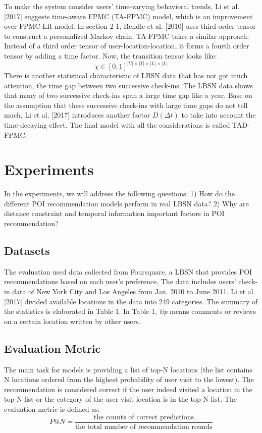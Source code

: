 \documentclass{sig-alternate}
\begin{document}
To make the system consider users' time-varying behavioral trends, Li et al. [2017] suggests time-aware FPMC (TA-FPMC) 
model, which is an improvement over FPMC-LR model. In section 2-1, Rendle et al. [2010] uses third order tensor to 
construct a personalized Markov chain. TA-FPMC takes a similar approach. Instead of a third order tensor of 
user-location-location, it forms a fourth order tensor by adding a time factor. Now, the transition tensor looks like: 
\begin{equation}
	\chi \in [0, 1]^{|U| \times |T| \times |L| \times |L|}
\label{eq:TA-FPMC_tensor}
\end{equation}
There is another statistical characteristic of LBSN data that has not got much attention, the time gap between 
two successive check-ins. The LBSN data shows that many of two successive check-ins span a large time gap 
like a year. Base on the assumption that these successive check-ins with large time gaps do not tell much, 
Li et al. [2017] introduces another factor $D(\Delta t)$ to take into account the time-decaying effect. 
The final model with all the considerations is called TAD-FPMC.

\section{Experiments}
\label{sec:experiments}
In the experiments, we will address the following questions: 1) How do the different POI recommendation 
models perform in real LBSN data? 2) Why are distance constraint and temporal information important 
factors in POI recommendation?

\subsection{Datasets}
\label{sec:datasets}
The evaluation used data collected from Foursquare, a LBSN that provides POI recommendations based on 
each user's preference. The data includes users' check-in data of New York City and Los Angeles from Jan. 
2010 to June 2011. Li et al. [2017] divided available locations in the data into 249 categories. 
The summary of the statistics is elaborated in Table 1. In Table 1, \emph{tip} means comments or reviews on a 
certain location written by other users.

\subsection{Evaluation Metric}
\label{metic}
The main task for models is providing a list of top-N locations (the list contains N locations 
ordered from the highest probability of user visit to the lowest). The recommendation is considered 
correct if the user indeed visited a location in the top-N list or the category of the user visit location 
is in the top-N list. The evaluation metric is defined as:
\begin{equation}
	P@N = \frac{\textrm{the counts of correct predictions}} {\textrm{the total number of recommendation rounds}}
\label{eq:P@N}
\end{equation}
\end{document}
